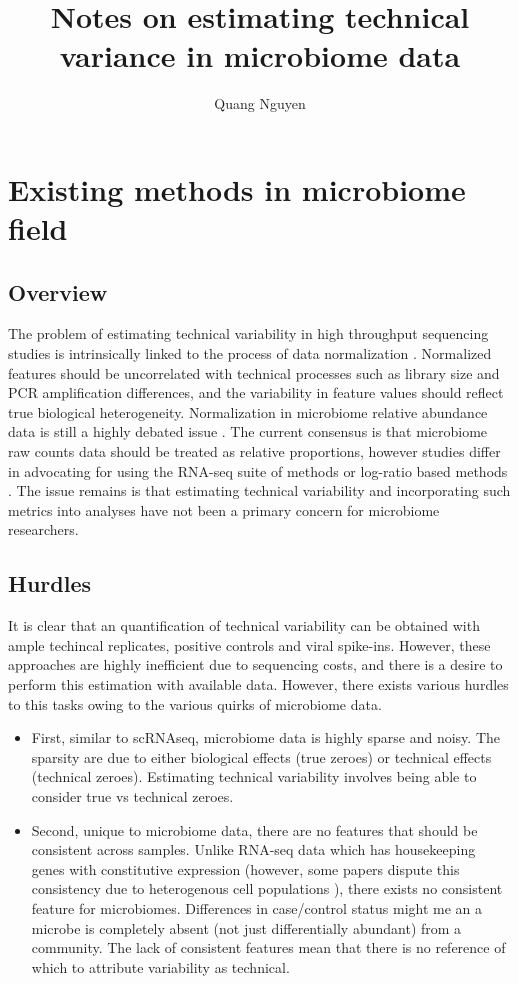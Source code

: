 \documentclass{article}
\title{Notes on estimating technical variance in microbiome data}
\author{Quang Nguyen}
\begin{document}
\maketitle
\section{Existing methods in microbiome field}
\subsection{Overview}
The problem of estimating technical variability in high throughput sequencing studies is intrinsically linked to the process of data normalization \cite{hafemeister2019}. Normalized features should be uncorrelated with technical processes such as library size and PCR amplification differences, and the variability in feature values should reflect true biological heterogeneity. Normalization in microbiome relative abundance data is still a highly debated issue \cite{weiss2017}. The current consensus is that microbiome raw counts data should be treated as relative proportions, however studies differ in advocating for using the RNA-seq suite of methods \cite{mcmurdie2014} or log-ratio based methods \cite{gloor2017}. The issue remains is that estimating technical variability and incorporating such metrics into analyses have not been a primary concern for microbiome researchers. 
\subsection{Hurdles}
It is clear that an quantification of technical variability can be obtained with ample techincal replicates, positive controls and viral spike-ins. However, these approaches are highly inefficient due to sequencing costs, and there is a desire to perform this estimation with available data. However, there exists various hurdles to this tasks owing to the various quirks of microbiome data. 
\begin{itemize}
    \item First, similar to scRNAseq, microbiome data is highly sparse and noisy. The sparsity are due to either biological effects (true zeroes) or technical effects (technical zeroes). Estimating technical variability involves being able to consider true vs technical zeroes. 
    \item Second, unique to microbiome data, there are no features that should be consistent across samples. Unlike RNA-seq data which has housekeeping genes with constitutive expression (however, some papers dispute this consistency due to heterogenous cell populations \cite{quinn2018}), there exists no consistent feature for microbiomes. Differences in case/control status might me an a microbe is completely absent (not just differentially abundant) from a community. The lack of consistent features mean that there is no reference of which to attribute variability as technical.  
\end{itemize}
\end{document}
